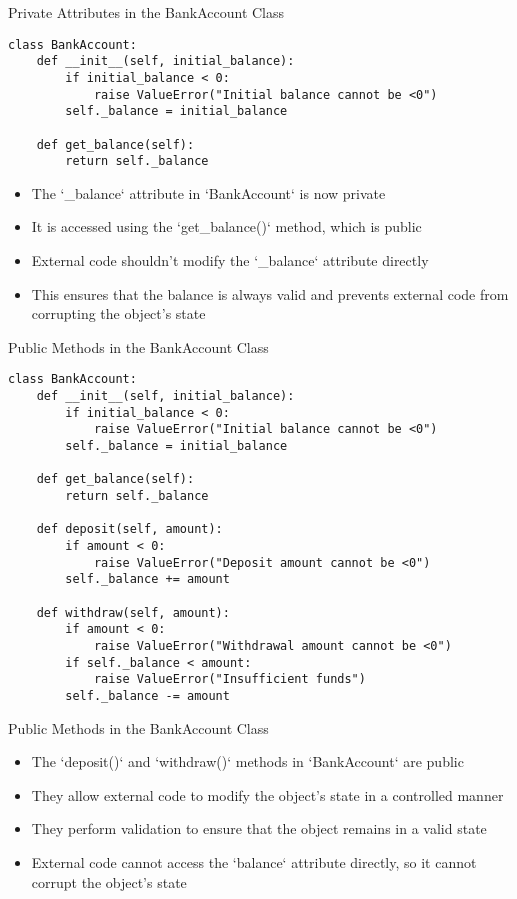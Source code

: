 \documentclass[handout]{beamer}
\begin{document}
\begin{frame}[fragile]{Private Attributes in the BankAccount Class}
  \begin{lstlisting}[style=python]
class BankAccount:
    def __init__(self, initial_balance):
        if initial_balance < 0:
            raise ValueError("Initial balance cannot be <0")
        self._balance = initial_balance

    def get_balance(self):
        return self._balance
  \end{lstlisting}
  \begin{itemize}
    \item The `\_balance` attribute in `BankAccount` is now private
    \item It is accessed using the `get\_balance()` method, which is public
    \item External code shouldn't modify the `\_balance` attribute directly
    \item This ensures that the balance is always valid and prevents external code from corrupting the object's state
  \end{itemize}
\end{frame}

\begin{frame}[fragile]{Public Methods in the BankAccount Class}
  \begin{lstlisting}[style=python]
class BankAccount:
    def __init__(self, initial_balance):
        if initial_balance < 0:
            raise ValueError("Initial balance cannot be <0")
        self._balance = initial_balance

    def get_balance(self):
        return self._balance
        
    def deposit(self, amount):
        if amount < 0:
            raise ValueError("Deposit amount cannot be <0")
        self._balance += amount

    def withdraw(self, amount):
        if amount < 0:
            raise ValueError("Withdrawal amount cannot be <0")
        if self._balance < amount:
            raise ValueError("Insufficient funds")
        self._balance -= amount
  \end{lstlisting}
\end{frame}

\begin{frame}[fragile]{Public Methods in the BankAccount Class}
  \begin{itemize}
    \item The `deposit()` and `withdraw()` methods in `BankAccount` are public
    \item They allow external code to modify the object's state in a controlled manner
    \item They perform validation to ensure that the object remains in a valid state
    \item External code cannot access the `balance` attribute directly, so it cannot corrupt the object's state
  \end{itemize}
\end{frame}
\end{document}
